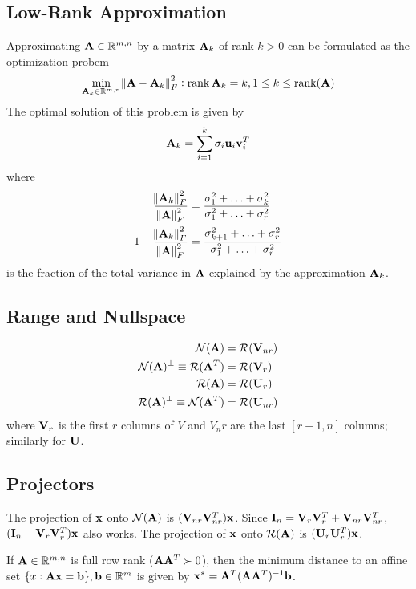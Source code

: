 \subsection*{Low-Rank Approximation}
Approximating $\mathbf{A}\in\mathbb{R}^{m,n}$ by a matrix $\mathbf{A}_k$ of rank $k>0$ can be formulated as the optimization probem
\begin{equation}
\min_{\mathbf{A}_k\in\mathbb{R}^{m,n}} \norm{\mathbf{A}-\mathbf{A}_k}_F^2: \operatorname{rank}{\mathbf{A}_k}=k, 1\le k \le \operatorname{rank}(\mathbf{A})
\end{equation}
The optimal solution of this problem is given by
\begin{equation}
\mathbf{A}_k=\sum_{i=1}^k \sigma_i \mathbf{u}_i \mathbf{v}_i^T
\end{equation}
where
\begin{align}
\frac{\norm{\mathbf{A}_k}_F^2}{\norm{\mathbf{A}}_F^2}&=\frac{\sigma_1^2+\ldots+\sigma_k^2}{\sigma_1^2+\ldots+\sigma_r^2} \\
1-\frac{\norm{\mathbf{A}_k}_F^2}{\norm{\mathbf{A}}_F^2}&=\frac{\sigma_{k+1}^2+\ldots+\sigma_r^2}{\sigma_1^2+\ldots+\sigma_r^2} 
\end{align}
is the fraction of the total variance in $\mathbf{A}$ explained by the approximation $\mathbf{A}_k$.

\subsection*{Range and Nullspace}
\begin{align}
\mathcal{N}(\mathbf{A}) &= \mathcal{R}(\mathbf{V}_{nr})                      \\
\mathcal{N}(\mathbf{A})^\perp \equiv\mathcal{R}(\mathbf{A}^T)&=\mathcal{R}(\mathbf{V}_r) \\
\mathcal{R}(\mathbf{A})&=\mathcal{R}(\mathbf{U}_r)                        \\
\mathcal{R}(\mathbf{A})^\perp\equiv\mathcal{N}(\mathbf{A}^T)&=\mathcal{R}(\mathbf{U}_{nr})
\end{align}
where $\mathbf{V}_r$ is the first $r$ columns of $V$ and $V_nr$ are the last $[r+1,n]$ columns; similarly for $\mathbf{U}$.


\subsection*{Projectors}
The projection of $\mathbf{x}$ onto $\mathcal{N}(\mathbf{A})$ is $(\mathbf{V}_{nr}\mathbf{V}_{nr}^T)\mathbf{x}$. Since $\mathbf{I}_n=\mathbf{V}_r\mathbf{V}_r^T+\mathbf{V}_{nr}\mathbf{V}_{nr}^T$, $(\mathbf{I}_n-\mathbf{V}_{r}\mathbf{V}_{r}^T)\mathbf{x}$ also works. The projection of $\mathbf{x}$ onto $\mathcal{R}(\mathbf{A})$ is $(\mathbf{U}_r\mathbf{U}_r^T)\mathbf{x}$.

If $\mathbf{A}\in\mathbb{R}^{m,n}$ is full row rank ($\mathbf{A}\mathbf{A}^T\succ0$), then the minimum distance to an affine set $\{x:\mathbf{A}\mathbf{x}=\mathbf{b}\}, \mathbf{b}\in\mathbb{R}^{m}$ is given by $\mathbf{x}^*=\mathbf{A}^T(\mathbf{A}\mathbf{A}^T)^{-1}\mathbf{b}$. %

